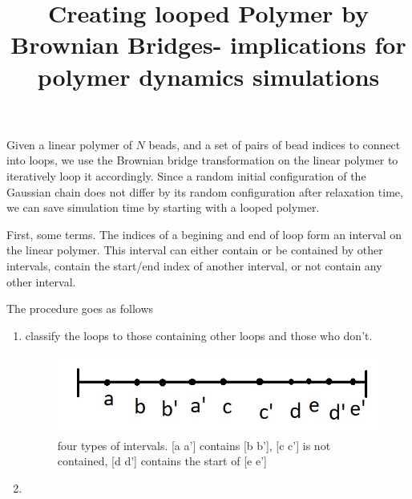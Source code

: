 \documentclass[12pt]{article}
\title{Creating looped Polymer by Brownian Bridges- implications for polymer dynamics simulations}
\begin{document}
\maketitle
Given a linear polymer of $N$ beads, and a set of pairs of bead indices to connect into loops, we use the Brownian bridge transformation on the linear polymer to iteratively loop it accordingly. Since a random initial configuration of the Gaussian chain does not differ by its random configuration after relaxation time, we can save simulation time by starting with a looped polymer. 

First, some terms. The indices of a begining and end of loop form an interval on the linear polymer. This interval can either contain or be contained by other intervals, contain the start/end index of another interval, or not contain any other interval. 

The procedure goes as follows 
\begin{enumerate}
\item classify the loops to those containing other loops and those who don't.\\
\begin{figure}[H!]
\includegraphics[scale=0.2]{possibleIntervalArrangements}
\caption{four types of intervals. [a a'] contains [b b'], [c c'] is not contained, [d d'] contains the start of [e e']}
\label{figure_possibleIntervalArrangements}
\end{figure}
\item
\end{enumerate}

 
\end{document}
